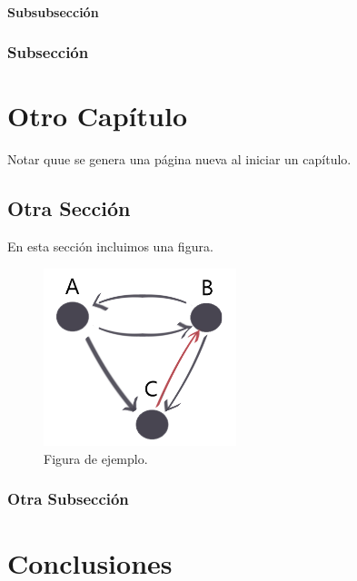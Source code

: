 \documentclass[12pt,a4paper,oneside]{book}
\begin{document}
\lipsum[4]


\subsubsection{Subsubsección}

\lipsum[5]

\subsection{Subsección}

\lipsum[6]



\chapter{Otro Capítulo}

Notar quue se genera una página nueva al iniciar un capítulo.

\section{Otra Sección}

En esta sección incluimos una figura.
\begin{figure}[ht]
 \centering
 \includegraphics[width=0.5\textwidth]{grafo.png}
 \caption{Figura de ejemplo.}
 \label{fig1}
\end{figure}

\subsection{Otra Subsección}
\lipsum[2-5]

\chapter{Conclusiones}
\lipsum[1-6]
\end{document}
